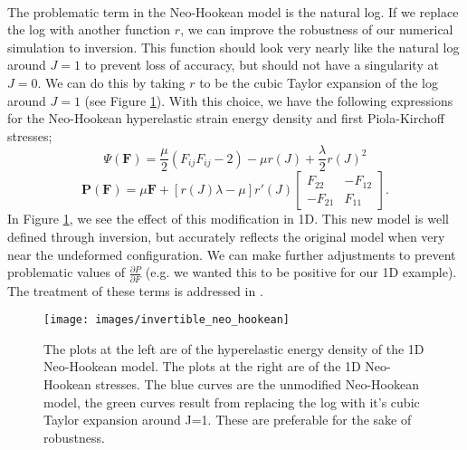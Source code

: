 \documentclass[article]{pcms-l}
\begin{document}
\\
The problematic term in the Neo-Hookean model is the natural log. If we replace the log with another function $r$, we can improve the robustness of our numerical simulation to inversion. This function should look very nearly like the natural log around $J=1$ to prevent loss of accuracy, but should not have a singularity at $J=0$. We can do this by taking $r$ to be the cubic Taylor expansion of the log around $J=1$ (see Figure \ref{inversion3}). With this choice, we have the following expressions for the Neo-Hookean hyperelastic strain energy density and first Piola-Kirchoff stresses;
$$
\Psi(\mathbf{F})=\frac{\mu}{2}(F_{ij}F_{ij}-2)-\mu{r}(J)+\frac{\lambda}{2}r(J)^2
$$
$$
\mathbf{P}(\mathbf{F})=\mu\mathbf{F}+\left[r(J)\lambda-\mu\right]r'(J)\left[\begin{array}{cc}
F_{22} & -F_{12}\\
-F_{21} & F_{11} \end{array}\right].
$$
In Figure \ref{inversion3}, we see the effect of this modification in 1D. This new model is well defined through inversion, but accurately reflects the original model when very near the undeformed configuration. We can make further adjustments to prevent problematic values of $\frac{\partial{P}}{\partial{F}}$ (e.g. we wanted this to be positive for our 1D example). The treatment of these terms is addressed in \cite{TeranQuas05}.
\begin{figure}
\texttt{[image: images/invertible\_neo\_hookean]}
\caption{The plots at the left are of the hyperelastic energy density of the 1D Neo-Hookean model. The plots at the right are of the 1D Neo-Hookean stresses. The blue curves are the unmodified Neo-Hookean model, the green curves result from replacing the log with it's cubic Taylor expansion around J=1. These are preferable for the sake of robustness.}
\label{inversion3}
\end{figure}
\end{document}
